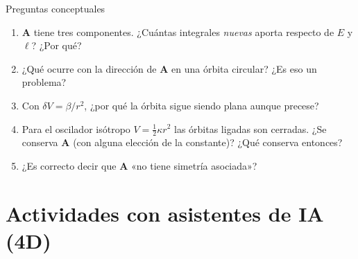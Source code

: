 \documentclass[aspectratio=169]{beamer}
\newif\ifdocente
\newcommand{\dd}{\mathrm{d}}
\newcommand{\vr}{\mathbf r}
\newcommand{\vp}{\mathbf p}
\newcommand{\vA}{\mathbf A}
\newcommand{\vl}{\boldsymbol\ell}
\newcommand{\rh}{\hat{\mathbf r}}
\begin{document}
\begin{frame}{Preguntas conceptuales}
\begin{enumerate}
  \item<1-> $\vA$ tiene tres componentes. ¿Cuántas integrales \emph{nuevas} aporta respecto de
        $E$ y $\vl$? ¿Por qué?
  \item<2-> ¿Qué ocurre con la dirección de $\vA$ en una órbita circular? ¿Es eso un problema?
  \item<3-> Con $\delta V=\beta/r^{2}$, ¿por qué la órbita sigue siendo plana aunque precese?
  \item<4-> Para el oscilador isótropo $V=\tfrac12\kappa r^{2}$ las órbitas ligadas son cerradas.
        ¿Se conserva $\vA$ (con alguna elección de la constante)? ¿Qué conserva entonces?
  \item<5-> ¿Es correcto decir que $\vA$ «no tiene simetría asociada»?
\end{enumerate}
\end{frame}

\ifdocente
\begin{frame}{Nota docente: respuestas a las preguntas conceptuales}
\footnotesize
\begin{enumerate}
  \item Una: $A$ depende de $E,\ell$ y $\vA\perp\vl$; queda el ángulo del pericentro en el
        plano. \emph{Error frecuente}: «tres integrales nuevas».
  \item $\vA=0$: la dirección no está definida porque no hay pericentro distinguido. No es un
        problema; el conteo de integrales independientes se hace en puntos genéricos.
  \item La perturbación es central: $\dot{\vl}=0$, luego el plano se conserva; solo
        $\vA$ gira dentro de él.
  \item No: $\dd\vA/\dd t=-\mu[r^{2}f+k]\dd\rh/\dd t$ con $f=-\kappa r$ no se anula para ningún $k$.
        El oscilador conserva el tensor simétrico $T_{ij}=p_ip_j/\mu+\mu\omega^{2}x_ix_j$
        (álgebra $\mathfrak{su}(3)$); sus órbitas son elipses centradas en el origen, no en un foco.
  \item No. En el espacio de fases $\vA$ genera una simetría (mezcla $\vr$ y $\vp$); no es una
        simetría puntual del lagrangiano. Conecta con la actividad IA-2(c).
\end{enumerate}
\end{frame}
\fi

\section[Actividades con IA]{Actividades con asistentes de IA (4D)}
\end{document}
